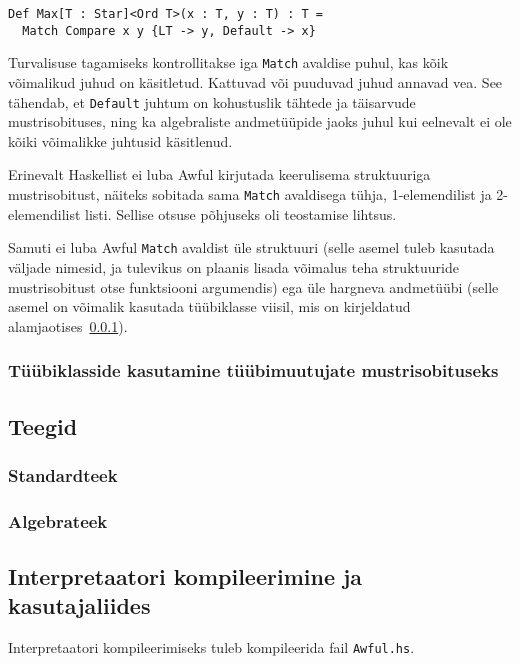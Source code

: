 \documentclass[12pt]{article}
\begin{document}
        \begin{verbatim}Def Max[T : Star]<Ord T>(x : T, y : T) : T =
  Match Compare x y {LT -> y, Default -> x}\end{verbatim}

        Turvalisuse tagamiseks kontrollitakse iga \verb!Match! avaldise puhul, kas kõik võimalikud juhud on käsitletud. Kattuvad või puuduvad juhud annavad vea. See tähendab, et \verb!Default! juhtum on kohustuslik tähtede ja täisarvude mustrisobituses, ning ka algebraliste andmetüüpide jaoks juhul kui eelnevalt ei ole kõiki võimalikke juhtusid käsitlenud.

        Erinevalt Haskellist ei luba Awful kirjutada keerulisema struktuuriga mustrisobitust, näiteks sobitada sama \verb!Match! avaldisega tühja, 1-elemendilist ja 2-elemendilist listi. Sellise otsuse põhjuseks oli teostamise lihtsus.

        Samuti ei luba Awful \verb!Match! avaldist üle struktuuri (selle asemel tuleb kasutada väljade nimesid, ja tulevikus on plaanis lisada võimalus teha struktuuride mustrisobitust otse funktsiooni argumendis) ega üle hargneva andmetüübi (selle asemel on võimalik kasutada tüübiklasse viisil, mis on kirjeldatud alamjaotises~\ref{tyybiklassihakk}).
      \subsubsection{Tüübiklasside kasutamine tüübimuutujate mustrisobituseks}\label{tyybiklassihakk}
        
    \subsection{Teegid}
      
      \subsubsection{Standardteek}
        
      \subsubsection{Algebrateek}
        
    \subsection{Interpretaatori kompileerimine ja kasutajaliides}
      Interpretaatori kompileerimiseks tuleb kompileerida fail \verb!Awful.hs!.
\end{document}
